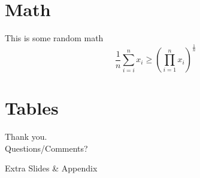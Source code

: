 \documentclass[aspectratio=169, 11pt]{beamer}
\begin{document}
	\section[Math]{Math}
	\begin{frame}[Math]{This is some random math}
		\begin{equation}
			\frac{1}{n} \sum_{i=i}^{n} x_{i} \geq
			\left(\prod _{i=1}^{n}x_{i}\right)^{\frac {1}{n}}
		\end{equation}
	\end{frame}



	\section[Tables]{Tables}


	{ %
		\begin{frame}[standout]
			Thank you.\\
			Questions/Comments? \\
		\end{frame}
	}



	\appendix

	{
		\begin{frame}[standout]{}
			Extra Slides \& Appendix
		\end{frame}
	}


\end{document}
